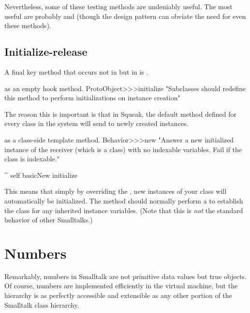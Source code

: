 \documentclass[a4paper,10pt,twoside]{book}
\begin{document}
Nevertheless, some of these testing methods are undeniably useful.
The most useful are probably  and  (though the \cite{Wool98a} design pattern can obviate the need for even these methods).


\subsection{Initialize-release}

A final key method that occurs not in  but in  is .

\begin{method}{ as an empty hook method.}
ProtoObject>>>initialize
    "Subclasses should redefine this method to perform initializations on instance creation"
\end{method}

The reason this is important is that in Squeak, the default  method defined for every class in the system will send  to newly created instances.

\begin{method}{ as a class-side template method.}
Behavior>>>new
    "Answer a new initialized instance of the receiver (which is a class) with no indexable variables. Fail if the class is indexable."

    ^ self basicNew initialize
\end{method}

This means that simply by overriding the  , new instances of your class will automatically be initialized.
The  method should normally perform a  to establish the class  for any inherited instance variables.
(Note that this is \emph{not} the standard behavior of other Smalltalks.)

\section{Numbers}
\label{sec:Number}
Remarkably, numbers in Smalltalk are not primitive data values but true objects.
Of course, numbers are implemented efficiently in the virtual machine, but the  hierarchy is as perfectly accessible and extensible as any other portion of the Smalltalk class hierarchy.
\end{document}
